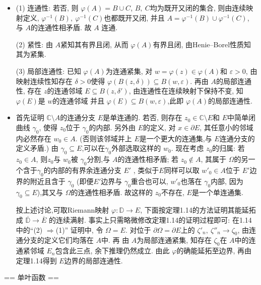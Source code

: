\begin{itemize}
    \item[1.3.2.1]


(1) 连通性: 若否, 则 $\varphi(A) = B\cup C$, $B,\ C$均为既开又闭的集合, 
则由连续映射定义,  $\varphi^{-1}(B),\ \varphi^{-1}(C)$也都既开又闭,
并且 $A = \varphi^{-1}(B)\cup \varphi^{-1}(C)$, 与 $A$的连通性相矛盾. 故 $A$ 连通.

(2) 紧性: 由 $A$紧知其有界且闭, 从而 $\varphi(A)$有界且闭, 由Henie--Borel性质知其为紧集.       

(3) 局部连通性: 已知 $\varphi(A)$为连通紧集, 
对 $w = \varphi(z) \in \varphi(A)$和 $\varepsilon>0$, 
由映射连续性知存在 $\delta>0$使得 $\varphi(B(z,\delta))\subseteq B(w,\varepsilon)$.
再由 $A$的局部连通性, 存在 $z$的连通邻域 $E\subseteq B(z,\delta')$, 
由连通性在连续映射下保持不变, 知 $\varphi(E)$是 $w$的连通邻域
并且 $\varphi(E)\subseteq B(w,\varepsilon)$,此即 $\varphi(A)$的局部连通性.


    \item[1.3.2.2]


首先证明 $\mathbb{C}\setminus A$的连通分支 $E$是单连通的. 
若否, 则存在 $z_0 \in \mathbb{C}\setminus E$和 $E$中简单闭曲线 $\gamma_0$,
使得 $z_0$位于 $\gamma_0$的内部. 另外由 $E$的定义, 对 $x \in \partial E$, 
其任意小的邻域内必然存在 $w_0 \in  A$. 
(否则该邻域并上 $E$是一个更大的连通集,与 $E$连通分支的定义矛盾.) 
由 $\gamma_0\subseteq E$,可以在$\gamma_0$外部选取这样的 $w_0$.
现在考虑 $z_0$的归属: 
若 $z_0 \in A$, 则$z_0$与 $w_0$被 $\gamma_0$分割,与 $A$的连通性相矛盾; 
若 $z_0 \not\in A$, 其属于 $\Omega$的另一个含于$\gamma_0$的内部的有界余连通分支 $E'$ ,
类似于$E$同样可以取 $w'_0 \in A$位于 $E'$边界的附近且含于 $\gamma_0$
(即便$E'$边界与 $\gamma_0$重合也可以, $w'_0$也落在 $\gamma_0$内部,
因为 $\gamma_0 \subseteq E$),其又与 $\Omega$的连通性相矛盾. 
故这样的 $z_0$不存在, $E$是一个单连通集.

按上述讨论,可取Riemann映射 $\varphi:\mathbb{D}\to E$, 
下面按定理1.14的方法证明其能延拓成 $\overline{\mathbb{D}}\to \overline{E}$
的连续满射. 事实上只需略微修改定理1.14的证明过程即可: 
在1.14中的“(2) $\Rightarrow$(1)” 证明中, 令 $\Omega = E$. 
对位于 $\partial \Omega = \partial E$上的 $\zeta'_n,\ \zeta''_{n}\to \zeta_0$,
由连通分支的定义它们均落在 $A$中. 再 由 $A$为局部连通紧集,
知存在 $\zeta_0$在 $A$中的连通紧邻域 $E_n$包含此三点, 余下推理仍然成立. 
由此 $\varphi$的确能延拓至边界, 再由定理1.14得到 $E$边界的局部连通性.
\end{itemize}

== 单叶函数 ==

